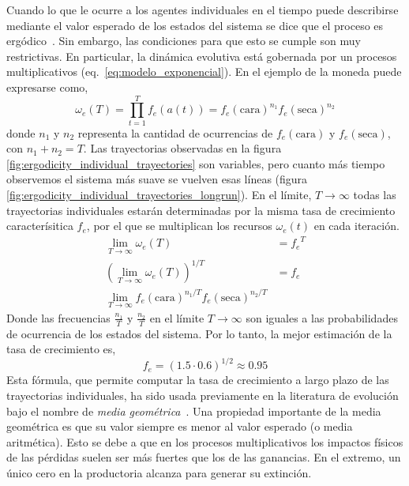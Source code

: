 \documentclass[a4paper,10pt]{article}
\begin{document}
%
Cuando lo que le ocurre a los agentes individuales en el tiempo puede describirse mediante el valor esperado de los estados del sistema se dice que el proceso es ergódico~\cite{peters2019-ergodicityEconomics}.
Sin embargo, las condiciones para que esto se cumple son muy restrictivas.
En particular, la dinámica evolutiva está gobernada por un procesos multiplicativos (eq.~\ref{eq:modelo_exponencial}).
En el ejemplo de la moneda puede expresarse como,
%
\begin{equation}
\omega_e(T) = \prod^T_{t=1} f_e(a(t)) = f_e(\text{cara})^{n_1} f_e(\text{seca})^{n_2}
\end{equation}
%
donde $n_1$ y $n_2$ representa la cantidad de ocurrencias de $f_e(\text{cara})$ y $f_e(\text{seca})$, con $n_1 + n_2 = T$.
Las trayectorias observadas en la figura \ref{fig:ergodicity_individual_trayectories} son variables, pero cuanto más tiempo observemos el sistema más suave se vuelven esas líneas (figura \ref{fig:ergodicity_individual_trayectories_longrun}).
En el límite, $T \rightarrow \infty$ todas las trayectorias individuales estarán determinadas por la misma tasa de crecimiento caracterísitica ${f_e}$, por el que se multiplican los recursos $\omega_e(t)$ en cada iteración.
\begin{equation} \label{eq:geometric_mean}
\begin{split}
\lim_{T \rightarrow \infty} \omega_e(T) & = {f_e}^T \\
\left( \lim_{T \rightarrow \infty} \omega_e(T) \right)^{1/T} & =  {f_e} \\
\lim_{T \rightarrow \infty} f_e(\text{cara})^{n_1/T} f_e(\text{seca})^{n_2/T} & 
 \end{split}
\end{equation}
Donde las frecuencias $\frac{n_1}{T}$ y $\frac{n_2}{T}$ en el límite $T \rightarrow \infty$ son iguales a las probabilidades de ocurrencia de los estados del sistema.
Por lo tanto, la mejor estimación de la tasa de crecimiento es,
\begin{equation}
{f_e} = (1.5 \cdot 0.6)^{1/2} \approx 0.95
\end{equation}
%
Esta fórmula, que permite computar la tasa de crecimiento a largo plazo de las trayectorias individuales, ha sido usada previamente en la literatura de evolución bajo el nombre de \emph{media geométrica}~\cite{dempster1955-geometricMean}.
Una propiedad importante de la media geométrica es que su valor siempre es menor al valor esperado (o media aritmética).
Esto se debe a que en los procesos multiplicativos los impactos físicos de las pérdidas suelen ser más fuertes que los de las ganancias.
En el extremo, un único cero en la productoria alcanza para generar su extinción.
\end{document}
